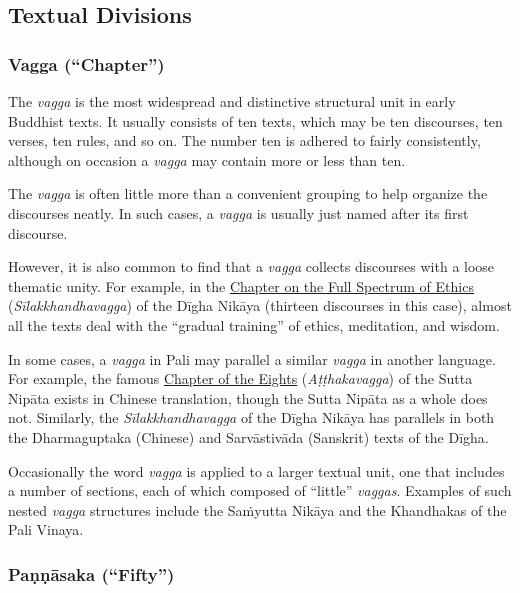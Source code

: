 \documentclass[12pt,openany]{book}%
\begin{document}
\subsection*{Textual Divisions}

\subsubsection*{Vagga (“Chapter”)}

The \textit{vagga} is the most widespread and distinctive structural unit in early Buddhist texts. It usually consists of ten texts, which may be ten discourses, ten verses, ten rules, and so on. The number ten is adhered to fairly consistently, although on occasion a \textit{vagga} may contain more or less than ten.

The \textit{vagga} is often little more than a convenient grouping to help organize the discourses neatly. In such cases, a \textit{vagga} is usually just named after its first discourse.

However, it is also common to find that a \textit{vagga} collects discourses with a loose thematic unity. For example, in the \href{https://suttacentral.net/dn-silakkhandhavagga}{Chapter on the Full Spectrum of Ethics} (\textit{\textsanskrit{Sīlakkhandhavagga}}) of the \textsanskrit{Dīgha} \textsanskrit{Nikāya} (thirteen discourses in this case), almost all the texts deal with the “gradual training” of ethics, meditation, and wisdom.

In some cases, a \textit{vagga} in Pali may parallel a similar \textit{vagga} in another language. For example, the famous \href{https://suttacentral.net/snp-atthakavagga}{Chapter of the Eights} (\textit{\textsanskrit{Aṭṭhakavagga}}) of the Sutta \textsanskrit{Nipāta} exists in Chinese translation, though the Sutta \textsanskrit{Nipāta} as a whole does not. Similarly, the \textit{\textsanskrit{Sīlakkhandhavagga}} of the \textsanskrit{Dīgha} \textsanskrit{Nikāya} has parallels in both the Dharmaguptaka (Chinese) and \textsanskrit{Sarvāstivāda} (Sanskrit) texts of the \textsanskrit{Dīgha}.

Occasionally the word \textit{vagga} is applied to a larger textual unit, one that includes a number of sections, each of which composed of “little” \textit{vaggas}. Examples of such nested \textit{vagga} structures include the \textsanskrit{Saṁyutta} \textsanskrit{Nikāya} and the Khandhakas of the Pali Vinaya.

\subsubsection*{\textsanskrit{Paṇṇāsaka} (“Fifty”)}
\end{document}
